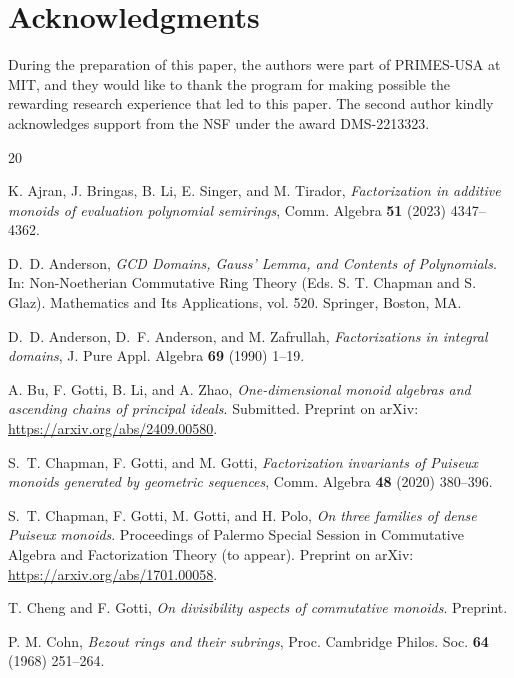 \documentclass[10pt]{amsart}
\theoremstyle{definition}
\theoremstyle{remark}
\numberwithin{equation}{section}
\begin{document}
\bigskip
\section*{Acknowledgments}

During the preparation of this paper, the authors were part of PRIMES-USA at MIT, and they would like to thank the program for making possible the rewarding research experience that led to this paper. The second author kindly acknowledges support from the NSF under the award DMS-2213323.






\bigskip
\begin{thebibliography}{20}

 K. Ajran, J. Bringas, B. Li, E. Singer, and M. Tirador, \emph{Factorization in additive monoids of evaluation polynomial semirings}, Comm. Algebra \textbf{51} (2023) 4347--4362.

 D.~D. Anderson, \emph{GCD Domains, Gauss' Lemma, and Contents of Polynomials}. In: Non-Noetherian Commutative Ring Theory (Eds. S. T. Chapman and S. Glaz). Mathematics and Its Applications, vol. 520. Springer, Boston, MA.

 D.~D. Anderson, D.~F. Anderson, and M. Zafrullah, \emph{Factorizations in integral domains}, J. Pure Appl. Algebra \textbf{69} (1990) 1--19.

 A. Bu, F. Gotti, B. Li, and A. Zhao, \emph{One-dimensional monoid algebras and ascending chains of principal ideals}. Submitted. Preprint on arXiv: \url{https://arxiv.org/abs/2409.00580}.

 S.~T. Chapman, F. Gotti, and M. Gotti, \emph{Factorization invariants of Puiseux monoids generated by geometric sequences}, Comm. Algebra \textbf{48} (2020) 380--396.

 S.~T. Chapman, F. Gotti, M. Gotti, and H. Polo, \emph{On three families of dense Puiseux monoids}. Proceedings of Palermo Special Session in Commutative Algebra and Factorization Theory (to appear). Preprint on arXiv: \url{https://arxiv.org/abs/1701.00058}.

 T. Cheng and F. Gotti, \emph{On divisibility aspects of commutative monoids}. Preprint.

 P. M. Cohn, \emph{Bezout rings and their subrings}, Proc. Cambridge Philos. Soc. \textbf{64} (1968) 251--264.


\end{thebibliography}
\end{document}
